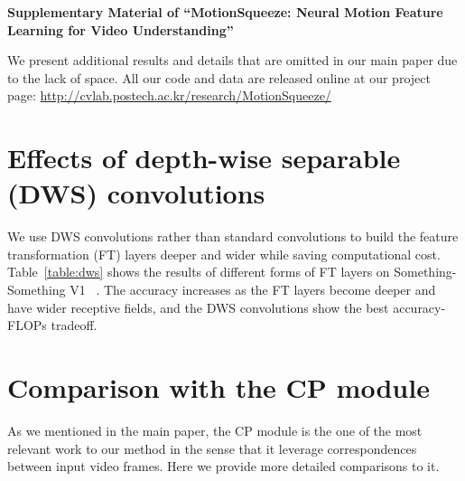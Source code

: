 \documentclass[runningheads]{llncs}
\begin{document}





















\clearpage

\newcommand{\Fig}[1]{Figure~\ref{fig:#1}}
\newcommand{\Sec}[1]{Section~\ref{sec:#1}}
\newcommand{\Eq}[1]{Equation~(\ref{eq:#1})}
\newcommand{\Tbl}[1]{Table~\ref{tab:#1}}

\def\httilde{\mbox{\tt\raisebox{-.5ex}{\symbol{126}}}}

\begin{center}
\textbf{\large Supplementary Material of \enquote{MotionSqueeze: Neural Motion Feature Learning for Video Understanding}}
\end{center}

\setcounter{section}{0}





We present additional results and details that are omitted in our main paper due to the lack of space. All our code and data are released online at our project page: \url{http://cvlab.postech.ac.kr/research/MotionSqueeze/} 

\section{Effects of depth-wise separable (DWS) convolutions}
We use DWS convolutions rather than standard convolutions to build the feature transformation (FT) layers deeper and wider while saving computational cost. Table~\ref{table:dws} shows the results of different forms of FT layers on Something-Something V1~\cite{goyal2017something} . The accuracy increases as the FT layers become deeper and have wider receptive fields, and the DWS convolutions show the best accuracy-FLOPs tradeoff.

\section{Comparison with the CP module~\cite{liu2019learning}}
As we mentioned in the main paper, the CP module is the one of the most relevant work to our method in the sense that it leverage correspondences between input video frames. Here we provide more detailed comparisons to it.
\end{document}
